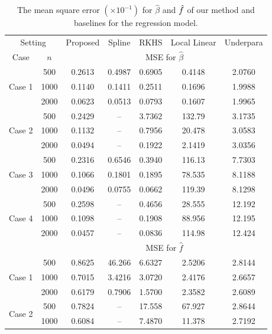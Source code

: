 \begin{table}[tb]
\centering
\centerfloat
    \caption{The mean square error $(\times 10^{-1})$ for $\hat{\beta}$ and $\hat{f}$ of our method and baselines for the regression model.}
	\label{tab:simulation1}
	\begin{tabular}{cc| ccccc}
 \toprule[1pt]
  \multicolumn{2}{c|}{Setting} & Proposed & Spline & RKHS & Local Linear & Underpara \\
    Case & $n$ &  \multicolumn{5}{c}{MSE for $\hat{\beta}$} \\
    \midrule[1pt]
    \multirow{3}{*}{Case 1}
    & 500 &  0.2613  &  0.4987  &  0.6905  & 0.4148 & 2.0760 \\
    &1000 &  0.1140  &  0.1411  &  0.2511  & 0.1696  & 1.9988 \\
    &2000 &  0.0623  &  0.0513  &  0.0793  & 0.1607 & 1.9965 \\
    \multirow{3}{*}{Case 2}
    & 500 &  0.2429  &  --  &  3.7362  & 132.79  & 3.1735 \\
    &1000 &  0.1132  &  -- &   0.7956  & 20.478  & 3.0583\\
    &2000 &  0.0494  &  --  &  0.1922   & 2.1419  & 3.0356 \\
    \multirow{3}{*}{Case 3}
    & 500 &  0.2316  &  0.6546  &  0.3940  & 116.13  & 7.7303\\
    &1000 &  0.1066  &  0.1801  &  0.1895  & 78.535  & 8.1188 \\
    &2000 &  0.0496  &  0.0755  &  0.0662  &  119.39 & 8.1298\\
    \multirow{3}{*}{Case 4}
    & 500 &  0.2598  &  --  & 0.4656   & 28.555 & 12.192 \\
    &1000 &  0.1098  &  --  & 0.1908   &  88.956 & 12.195 \\
    &2000 &  0.0457  &  --  & 0.0836   & 114.98  & 12.424\\
        \hline
   && \multicolumn{5}{c}{MSE for $\hat{f}$} \\
     \hline
\multirow{3}{*}{Case 1}
    & 500 &  0.8625  &  46.266  & 6.6327   &  2.5206 & 2.8144 \\
    &1000 &  0.7015  &  3.4216  &  3.0720  & 2.4176  & 2.6657 \\
    &2000 &  0.6179  &  0.7906  & 1.5700   & 2.3582  & 2.6089\\
    \multirow{3}{*}{Case 2}
    & 500 &  0.7824  &  --  &  17.558  &  67.927& 2.8644 \\
    &1000 &  0.6084  &  --  &  7.4870  & 11.378  & 2.7192 \\

\end{tabular}
\end{table}
